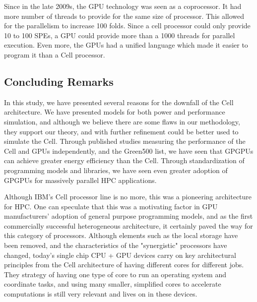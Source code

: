 \documentclass{sig-alternate-05-2015}
\begin{document}
Since in the late 2009s, the GPU technology was seen as a coprocessor. It had more number of threads to provide for the same size of processor. This allowed for the parallelism to increase 100 folds. Since a cell processor could only provide 10 to 100 SPEs, a GPU could provide more than a 1000 threads for parallel execution. Even more, the GPUs had a unified language which made it easier to program it than a Cell processor.

\subsection{Concluding Remarks}

In this study, we have presented several reasons for the downfall of the Cell architecture. We have presented models for both power and performance simulation, and although we believe there are some flaws in our methodology, they support our theory, and with further refinement could be better used to simulate the Cell. Through published studies measuring the performance of the Cell and GPUs independently, and the Green500 list, we have seen that GPGPUs can achieve greater energy efficiency than the Cell. Through standardization of programming models and libraries, we have seen even greater adoption of GPGPUs for massively parallel HPC applications.

Although IBM's Cell processor line is no more, this was a pioneering architecture for HPC. One can speculate that this was a motivating factor in GPU manufacturers' adoption of general purpose programming models, and as the first commercially successful heterogeneous architecture, it certainly paved the way for this category of processors. Although elements such as the local storage have been removed, and the characteristics of the "synergistic" processors have changed, today's single chip CPU + GPU devices carry on key architectural principles from the Cell architecture of having different cores for different jobs. They strategy of having one type of core to run an operating system and coordinate tasks, and using many smaller, simplified cores to accelerate computations is still very relevant and lives on in these devices.


%
%
\end{document}
